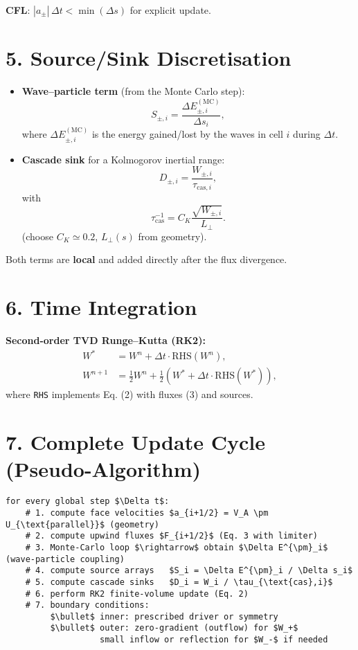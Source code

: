 \textbf{CFL}: $|a_\pm|\, \Delta t < \min(\Delta s)$ for explicit update.

\hrulefill

\section*{5. Source/Sink Discretisation}

\begin{itemize}
    \item \textbf{Wave–particle term} (from the Monte Carlo step):
    \[
    S_{\pm, i} = \frac{\Delta E_{\pm, i}^{(\text{MC})}}{\Delta s_i},
    \]
    where $\Delta E_{\pm, i}^{(\text{MC})}$ is the energy gained/lost by the waves in cell $i$ during $\Delta t$.

    \item \textbf{Cascade sink} for a Kolmogorov inertial range:
    \[
    D_{\pm, i} = \frac{W_{\pm, i}}{\tau_{\text{cas}, i}},
    \]
    with
    \[
    \tau_{\text{cas}}^{-1} = C_K \frac{\sqrt{W_{\pm, i}}}{L_\perp}.
    \]
    (choose $C_K \simeq 0.2$, $L_\perp(s)$ from geometry).
\end{itemize}

Both terms are \textbf{local} and added directly after the flux divergence.

\hrulefill

\section*{6. Time Integration}

\textbf{Second-order TVD Runge–Kutta (RK2):}
\begin{align*}
W^*      &= W^n + \Delta t \cdot \text{RHS}(W^n), \\
W^{n+1}  &= \frac{1}{2} W^n + \frac{1}{2} (W^* + \Delta t \cdot \text{RHS}(W^*)),
\end{align*}
where \texttt{RHS} implements Eq. (2) with fluxes (3) and sources.

\hrulefill

\section*{7. Complete Update Cycle (Pseudo-Algorithm)}

\begin{lstlisting}[language={}, mathescape=true]
for every global step $\Delta t$:
    # 1. compute face velocities $a_{i+1/2} = V_A \pm U_{\text{parallel}}$ (geometry)
    # 2. compute upwind fluxes $F_{i+1/2}$ (Eq. 3 with limiter)
    # 3. Monte-Carlo loop $\rightarrow$ obtain $\Delta E^{\pm}_i$ (wave-particle coupling)
    # 4. compute source arrays   $S_i = \Delta E^{\pm}_i / \Delta s_i$
    # 5. compute cascade sinks   $D_i = W_i / \tau_{\text{cas},i}$
    # 6. perform RK2 finite-volume update (Eq. 2)
    # 7. boundary conditions:
         $\bullet$ inner: prescribed driver or symmetry
         $\bullet$ outer: zero-gradient (outflow) for $W_+$
                   small inflow or reflection for $W_-$ if needed
\end{lstlisting}

